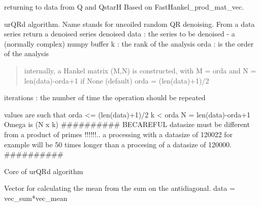 \documentclass[letterpaper,10pt,openany,oneside]{sphinxmanual}
\begin{document}

\begin{fulllineitems}
\label{rst/code:Algo.urQRd.Fast_Hankel2dt}
returning to data from Q and QstarH
Based on FastHankel\_prod\_mat\_vec.

\end{fulllineitems}


\begin{fulllineitems}
\label{rst/code:Algo.urQRd.urQRd}
urQRd algorithm. Name stands for uncoiled random QR denoising.
From a data series return a denoised series denoised
data : the series to be denoised - a (normally complex) numpy buffer
k : the rank of the analysis
orda : is the order of the analysis
\begin{quote}

internally, a Hankel matrix (M,N) is constructed, with M = orda and N = len(data)-orda+1
if None (default) orda = (len(data)+1)/2
\end{quote}

iterations : the number of time the operation should be repeated

values are such that
orda \textless{}= (len(data)+1)/2
k \textless{} orda
N = len(data)-orda+1
Omega is (N x k)
\#\#\#\#\#\#\#\#\#\#
BECAREFUL datasize must be different from a product of primes !!!!!!..
a processing with a datasize of 120022 for example will be 50 times longer than
a procesing of a datasize of 120000.
\#\#\#\#\#\#\#\#\#\#

\end{fulllineitems}


\begin{fulllineitems}
\label{rst/code:Algo.urQRd.urQRdCore}
Core of urQRd algorithm

\end{fulllineitems}


\begin{fulllineitems}
\label{rst/code:Algo.urQRd.vec_mean}
Vector for calculating the mean from the sum on the antidiagonal.
data = vec\_sum*vec\_mean

\end{fulllineitems}
\end{document}
